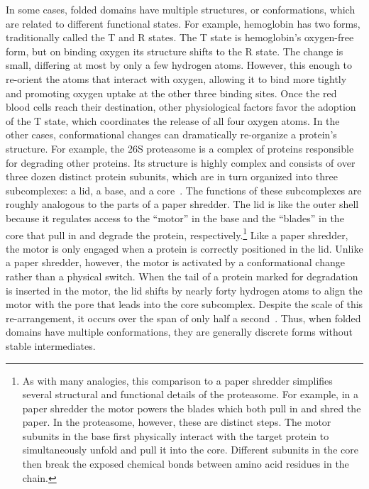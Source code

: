In some cases, folded domains have multiple structures, or conformations, which are related to different functional states. For example, hemoglobin has two forms, traditionally called the T and R states. The T state is hemoglobin's oxygen-free form, but on binding oxygen its structure shifts to the R state. The change is small, differing at most by only a few hydrogen atoms. However, this enough to re-orient the atoms that interact with oxygen, allowing it to bind more tightly and promoting oxygen uptake at the other three binding sites. Once the red blood cells reach their destination, other physiological factors favor the adoption of the T state, which coordinates the release of all four oxygen atoms. In the other cases, conformational changes can dramatically re-organize a protein's structure. For example, the 26S proteasome is a complex of proteins responsible for degrading other proteins. Its structure is highly complex and consists of over three dozen distinct protein subunits, which are in turn organized into three subcomplexes: a lid, a base, and a core~\cite{Finley2016, Bard2018}. The functions of these subcomplexes are roughly analogous to the parts of a paper shredder. The lid is like the outer shell because it regulates access to the ``motor'' in the base and the ``blades'' in the core that pull in and degrade the protein, respectively.\footnote{As with many analogies, this comparison to a paper shredder simplifies several structural and functional details of the proteasome. For example, in a paper shredder the motor powers the blades which both pull in and shred the paper. In the proteasome, however, these are distinct steps. The motor subunits in the base first physically interact with the target protein to simultaneously unfold and pull it into the core. Different subunits in the core then break the exposed chemical bonds between amino acid residues in the chain.} Like a paper shredder, the motor is only engaged when a protein is correctly positioned in the lid. Unlike a paper shredder, however, the motor is activated by a conformational change rather than a physical switch. When the tail of a protein marked for degradation is inserted in the motor, the lid shifts by nearly forty hydrogen atoms to align the motor with the pore that leads into the core subcomplex. Despite the scale of this re-arrangement, it occurs over the span of only half a second~\cite{Bard2019}. Thus, when folded domains have multiple conformations, they are generally discrete forms without stable intermediates.

